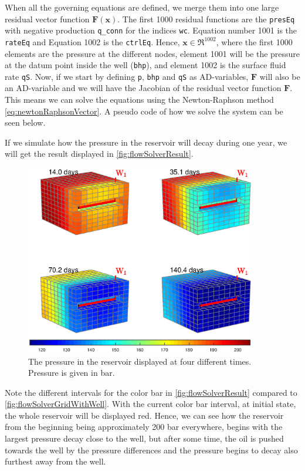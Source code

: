 When all the governing equations are defined, we merge them into one large residual vector function $\boldsymbol{F}(\boldsymbol{x})$. The first 1000 residual functions are the \texttt{presEq} with negative production \texttt{q\_conn} for the indices \texttt{wc}. Equation number 1001 is the \texttt{rateEq} and Equation 1002 is the \texttt{ctrlEq}. Hence, $\boldsymbol{x}\in\Re^{1002}$, where the first 1000 elements are the pressure at the different nodes, element 1001 will be the pressure at the datum point inside the well (\texttt{bhp}), and element 1002 is the surface fluid rate \texttt{qS}. Now, if we start by defining \texttt{p}, \texttt{bhp} and \texttt{qS} as AD-variables, $\boldsymbol{F}$ will also be an AD-variable and we will have the Jacobian of the residual vector function $\boldsymbol{F}$. This means we can solve the equations using the Newton-Raphson method \eqref{eq:newtonRaphsonVector}. A pseudo code of how we solve the system can be seen below.

If we simulate how the pressure in the reservoir will decay during one year, we will get the result displayed in \autoref{fig:flowSolverResult}.
\begin{figure}[htbp]
    \centering
    \includegraphics[width = 0.9\textwidth]{figures/flowSolver_result.eps}
    \caption{The pressure in the reservoir displayed at four different times. Pressure is given in bar.}
    \label{fig:flowSolverResult}
\end{figure}
Note the different intervals for the color bar in \autoref{fig:flowSolverResult} compared to \autoref{fig:flowSolverGridWithWell}. With the current color bar interval, at initial state, the whole reservoir will be displayed red. Hence, we can see how the reservoir from the beginning being approximately 200 bar everywhere, begins with the largest pressure decay close to the well, but after some time, the oil is pushed towards the well by the pressure differences and the pressure begins to decay also furthest away from the well. 


